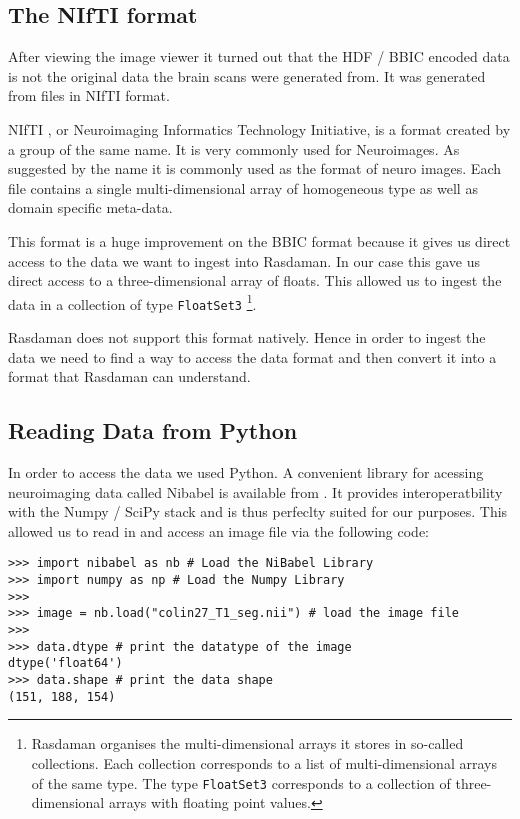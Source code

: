\label{sec:ingestion}

\subsection{The NIfTI format}

After viewing the image viewer it turned out that the HDF / BBIC encoded data is not the original data the brain scans were generated from. It was generated from files in NIfTI format. 

NIfTI \cite{NIfTI:website}, or Neuroimaging Informatics Technology Initiative, is a format created by a group of the same name. It is very commonly used for Neuroimages. As suggested by the name it is commonly used as the format of neuro images. Each file contains a single multi-dimensional array of homogeneous type as well as domain specific meta-data. 

This format is a huge improvement on the BBIC format because it gives us direct access to the data we want to ingest into Rasdaman. In our case this gave us direct access to a three-dimensional array of floats. This allowed us to ingest the data in a collection of type \lstinline{FloatSet3} \footnote{Rasdaman organises the multi-dimensional arrays it stores in so-called collections. Each collection corresponds to a list of multi-dimensional arrays of the same type. The type \lstinline{FloatSet3} corresponds to a collection of three-dimensional arrays with floating point values. }. 

Rasdaman does not support this format natively. Hence in order to ingest the data we need to find a way to access the data format and then convert it into a format that Rasdaman can understand. 

\subsection{Reading Data from Python}

In order to access the data we used Python. A convenient library for acessing neuroimaging data called Nibabel is available from \cite{Nibabel:website}. It provides interoperatbility with the Numpy / SciPy stack and is thus perfeclty suited for our purposes. This allowed us to read in and access an image file via the following code: 
\begin{lstlisting}
>>> import nibabel as nb # Load the NiBabel Library
>>> import numpy as np # Load the Numpy Library
>>>
>>> image = nb.load("colin27_T1_seg.nii") # load the image file
>>>
>>> data.dtype # print the datatype of the image
dtype('float64')
>>> data.shape # print the data shape
(151, 188, 154)
\end{lstlisting}

